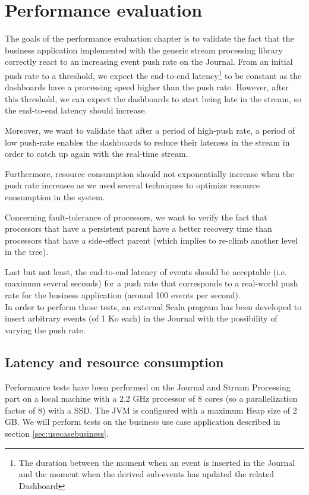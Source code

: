 \chapter{Performance evaluation}
\label{sec:perfeval}

The goals of the performance evaluation chapter is to validate the fact that the business application implemented with the generic stream processing library correctly react to an increasing event push rate on the Journal. From an initial push rate to a threshold, we expect the end-to-end latency\footnote{The duration between the moment when an event is inserted in the Journal and the moment when the derived sub-events has updated the related Dashboard} to be constant as the dashboards have a processing speed higher than the push rate. However, after this threshold, we can expect the dashboards to start being late in the stream, so the end-to-end latency should increase.

Moreover, we want to validate that after a period of high-push rate, a period of low push-rate enables the dashboards to reduce their lateness in the stream in order to catch up again with the real-time stream.

Furthermore, resource consumption should not exponentially increase when the push rate increases as we used several techniques to optimize resource consumption in the system.

Concerning fault-tolerance of processors, we want to verify the fact that processors that have a persistent parent have a better recovery time than processors that have a side-effect parent (which implies to re-climb another level in the tree).

Last but not least, the end-to-end latency of events should be acceptable (i.e. maximum several seconds) for a push rate that corresponds to a real-world push rate for the business application (around 100 events per second).
\\

In order to perform those tests, an external Scala program has been developed to insert arbitrary events (of 1 Ko each) in the Journal with the possibility of varying the push rate.


\section{Latency and resource consumption}

Performance tests have been performed on the Journal and Stream Processing part on a local machine with a 2.2 GHz processor of 8 cores (so a parallelization factor of 8) with a SSD. The JVM is configured with a maximum Heap size of 2 GB. We will perform tests on the business use case application described in section \ref{sec:usecasebusiness}.
\\

